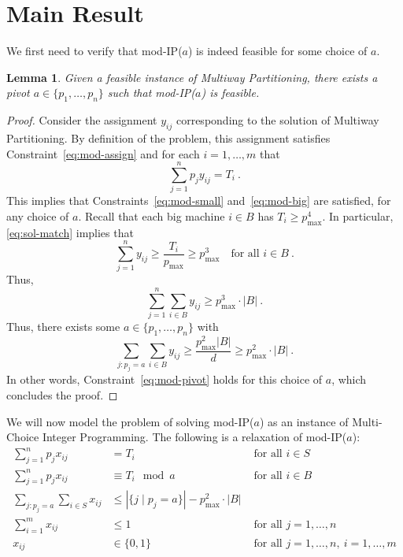 \documentclass{article}
\newcommand{\mIP}{mod-IP($a$)}
\newtheorem{lemma}[theorem]{Lemma}
\begin{document}
\section{Main Result}
\label{sec:appl}
We first need to verify that \mIP{} is indeed feasible for some choice of $a$.
\begin{lemma}
	Given a feasible instance of Multiway Partitioning, there exists a pivot $a\in \{p_1,\dotsc,p_n\}$
	such that \mIP{} is feasible.
\end{lemma}
\begin{proof}
	Consider the assignment $y_{ij}$ corresponding to the solution of Multiway Partitioning.
	By definition of the problem, this assignment satisfies Constraint~\eqref{eq:mod-assign}
	and for each $i=1,\dotsc,m$
	that
	\begin{equation}
		\sum_{j=1}^n p_j y_{ij} = T_i \ . \label{eq:sol-match}
	\end{equation}
	This implies that Constraints~\eqref{eq:mod-small} and~\eqref{eq:mod-big} are satisfied, for any choice of $a$.
	Recall that each big machine $i\in B$ has $T_i \ge p_{\max}^4$. In particular, \eqref{eq:sol-match}
	implies that 
	\begin{equation}
		\sum_{j=1}^n y_{ij} \ge \frac{T_i}{p_{\max}} \ge p_{\max}^3 \quad \text{for all } i\in B \ .
	\end{equation}
	Thus,
	\begin{equation}
		\sum_{j=1}^n \sum_{i\in B} y_{ij} \ge p_{\max}^3 \cdot |B| \ .
	\end{equation}
	Thus, there exists some $a\in \{p_1,\dotsc,p_n\}$ with
	\begin{equation}
		\sum_{j : p_j = a} \sum_{i\in B} y_{ij} \ge \frac{p_{\max}^2 |B|}{d} \ge p^2_{\max} \cdot |B| \ .
	\end{equation}
	In other words, Constraint~\eqref{eq:mod-pivot} holds for this choice of $a$, which concludes the proof.
\end{proof}
We will now model the problem of solving \mIP{} as an instance
of Multi-Choice Integer Programming.
The following is a relaxation of \mIP{}:
\begin{align*}
	\sum_{j=1}^n p_j x_{ij} &= T_i &\text{ for all } i\in S \\
	\sum_{j=1}^n p_j x_{ij} &\equiv T_i \mod a &\text{ for all } i\in B \\
	\sum_{j : p_j = a}\sum_{i\in S} x_{ij} &\le |\{j \mid p_j = a\}| - p_{\max}^2 \cdot |B| & \\
	\sum_{i=1}^m x_{ij} &\le 1 &\text{ for all } j=1,\dotsc,n \\
	x_{ij} &\in \{0, 1\} &\text{ for all } j=1,\dotsc,n,\ i=1,\dotsc,m
\end{align*}
\end{document}
